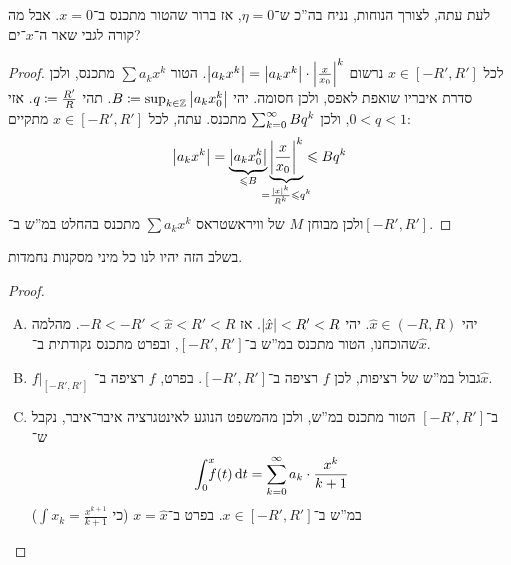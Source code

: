 \documentclass[name=רשימות חדו''א 2א]{../../../tex/classes/noChapterMegasumPreamble}
\begin{document}
	לעת עתה, לצורך הנוחות, נניח בה''כ ש־$\eta = 0$, אז ברור שהטור מתכנס ב־$x = 0$. אבל מה קורה לגבי שאר ה־$x$־ים?
	\begin{proof}
		לכל $x \in [-R', R']$ נרשום $\left \lvert a_kx^{k} \right \rvert = \left \lvert a_kx^{k} \right \rvert\cdot \left \lvert \frac{x}{x_0} \right \rvert^{k}$. הטור $\sum a_kx^{k}$ מתכנס, ולכן סדרת איבריו שואפת לאפס, ולכן חסומה. יהי $B \coloneqq \sup_{k \in \mathbb{Z}}\left \lvert a_kx_0^{k} \right \rvert$. תהי $q\coloneqq\frac{R'}{R}$. אזי $0 < q < 1$, ולכן $\sum_{k = 0}^{\infty} Bq^{k}$ מתכנס. עתה, לכל $x \in [-R', R']$ מתקיים:
		\[ \sof{a_kx^{k}} = \underbrace{\sof{a_kx_0^{k}}}_{\le B}\underbrace{\sof{\frac{x}{x_0}}^{k}}_{\mathclap{=\frac{\sof x ^{k}}{R^{k}} \le q^{k}}} \le Bq^{k} \]
		ולכן מבוחן $M$ של וויראשטראס $\sum a_kx^{k}$ מתכנס בהחלט במ''ש ב־$[-R', R']$.
	\end{proof}

	בשלב הזה יהיו לנו כל מיני מסקנות נחמדות.
	\begin{proof}
		\begin{enumerate}[(A)]
			\item יהי $\hat x \in (-R, R)$. יהי $\left \lvert \hat x \right \rvert < R' < R$. אז $-R < -R' < \hat x < R ' < R$. מהלמה שהוכחנו, הטור מתכנס במ''ש ב־$[-R', R']$, ובפרט מתכנס נקודתית ב־$\hat x$.
			\item $f|_{[-R', R']}$ גבול במ''ש של רציפות, לכן $f$ רציפה ב־$[-R', R']$. בפרט, $f$ רציפה ב־$\hat x$.
			\item ב־$[-R', R']$ הטור מתכנס במ''ש, ולכן מהמשפט הנוגע לאינטגרציה איבר־איבר, נקבל ש־
			\[ \int^{x}_0 \!\!\!\!\!\! \ f(t)\,\mathrm{d}t = \sum_{k = 0}^{\infty} a_k \cdot \frac{x^{k}}{k + 1} \]
			במ''ש ב־$x \in [-R', R']$. בפרט ב־$x = \hat x$ (כי $\int x_k = \frac{x^{k + 1}}{k + 1}$)
		\end{enumerate}
	\end{proof}
\end{document}
